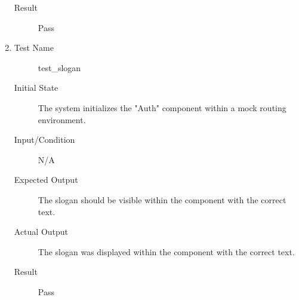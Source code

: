 \documentclass[12pt, titlepage]{article}
\begin{document}
\begin{enumerate}[UT-UA1]
\begin{description}
    \item[Result] Pass
    \end{description}
  \item \label{UT-UA4}
    \begin{description}
    \item[Test Name] test\_slogan
    \item[Initial State]  The system initializes the "Auth" component within a mock routing environment.
    \item[Input/Condition] N/A
    \item[Expected Output] The slogan should be visible within the component with the correct text.
    \item[Actual Output] The slogan was displayed within the component with the correct text.
    \item[Result] Pass
    \end{description}
\end{enumerate}
\end{document}
